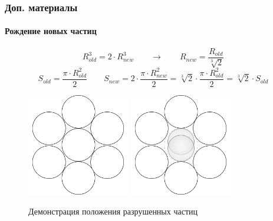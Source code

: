 \documentclass[c]{beamer}  %
\begin{document}
\begin{frame}
\frametitle{Доп. материалы} 
\framesubtitle{Рождение новых частиц}
\begin{equation*}
R_{old}^3 = 2 \cdot R^3_{new} \qquad \rightarrow \qquad R_{new} =\frac{R_{old}}{\sqrt[3]{2}}
\end{equation*}
\begin{equation*}
S_{old} = \frac{\pi \cdot R_{old}^2}{2} \qquad S_{new} = 2 \cdot \frac{\pi \cdot R_{new}^2}{2} = \sqrt[3]{2} \cdot \frac{\pi \cdot R_{old}^2}{2} = \sqrt[3]{2} \cdot S_{old}
\end{equation*}
\begin{figure}[h!]
	\centering
	\includegraphics[width=0.4\textwidth]{1_balls}
	\includegraphics[width=0.4\textwidth]{2_balls}
	\caption{Демонстрация положения разрушенных частиц}
\end{figure} 
\end{frame}



 
\end{document}

